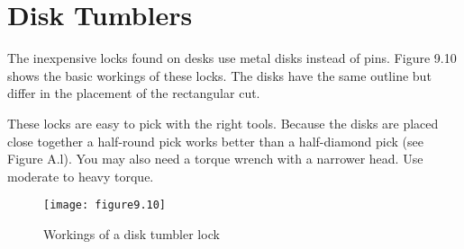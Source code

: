 \section{Disk Tumblers}
The inexpensive locks found on desks use metal disks instead of pins. Figure 9.10 shows the
basic workings of these locks. The disks have the same outline but differ in the placement
of the rectangular cut.

These locks are easy to pick with the right tools. Because the disks are placed close
together a half-round pick works better than a half-diamond pick (see Figure A.l). You may
also need a torque wrench with a narrower head. Use moderate to heavy torque.

\begin{figure}
    \texttt{[image: figure9.10]}
    \caption{Workings of a disk tumbler lock}
\end{figure}
